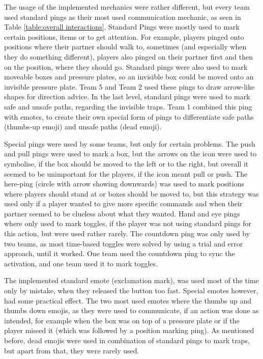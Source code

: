 The usage of the implemented mechanics were rather different, but every team used standard pings as their most used communication mechanic, as seen in Table \ref{table:overall interactions}. 
Standard Pings were mostly used to mark certain positions, items or to get attention. For example, players pinged onto positions where their partner should walk to, sometimes (and especially when they do something different), players also pinged on their partner first and then on the position, where they should go.
Standard pings were also used to mark moveable boxes and pressure plates, so an invisible box could be moved onto an invisible pressure plate. Team 5 and Team 2 used these pings to draw arrow-like shapes for direction advice. 
In the last level, standard pings were used to mark safe and unsafe paths, regarding the invisible traps. Team 1 combined this ping with emotes, to create their own special form of pings to differentiate safe paths (thumbs-up emoji) and unsafe paths (dead emoji).

Special pings were used by some teams, but only for certain problems. The push and pull pings were used to mark a box, but the arrows on the icon were used to symbolise, if the box should be moved to the left or to the right, but overall it seemed to be unimportant for the players, if the icon meant pull or push.
The here-ping (circle with arrow showing downwards) was used to mark positions where players should stand at or boxes should be moved to, but this strategy was used only if a player wanted to give more specific commands and when their partner seemed to be clueless about what they wanted.
Hand and eye pings where only used to mark toggles, if the player was not using standard pings for this action, but were used rather rarely.
The countdown ping was only used by two teams, as most time-based toggles were solved by using a trial and error approach, until it worked. One team used the countdown ping to sync the activation, and one team used it to mark toggles.

The implemented standard emote (exclamation mark), was used most of the time only by mistake, when they released the button too fast.
Special emotes however, had some practical effect. The two most used emotes where the thumbs up and thumbs down emojis, as they were used to communicate, if an action was done as intended, for example when the box was on top of a pressure plate or if the player missed it (which was followed by a position marking ping).
As mentioned before, dead emojis were used in combination of standard pings to mark traps, but apart from that, they were rarely used. 

